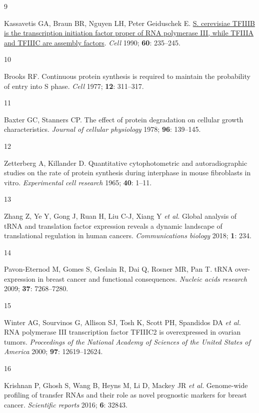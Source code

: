 \documentclass[
  11pt,
]{article}
\newlength{\cslhangindent}
\newlength{\csllabelwidth}
\newlength{\cslentryspacingunit} %
\newenvironment{CSLReferences}[2] %
 {%
  \setlength{\parindent}{0pt}
  \ifodd #1
  \let\oldpar\par
  \def\par{\hangindent=\cslhangindent\oldpar}
  \fi
  \setlength{\parskip}{#2\cslentryspacingunit}
 }%
 {}
\newcommand{\CSLLeftMargin}[1]{\parbox[t]{\csllabelwidth}{#1}}
\newcommand{\CSLRightInline}[1]{\parbox[t]{\linewidth - \csllabelwidth}{#1}\break}
\begin{document}
\begin{CSLReferences}{0}{0}
\leavevmode{}%
\CSLLeftMargin{9 }%
\CSLRightInline{Kassavetis GA, Braun BR, Nguyen LH, Peter Geiduschek E. \href{https://doi.org/10.1016/0092-8674(90)90739-2}{S. cerevisiae TFIIIB is the transcription initiation factor proper of RNA polymerase III, while TFIIIA and TFIIIC are assembly factors}. \emph{Cell} 1990; \textbf{60}: 235--245.}

\leavevmode{}%
\CSLLeftMargin{10 }%
\CSLRightInline{Brooks RF. Continuous protein synthesis is required to maintain the probability of entry into {S} phase. \emph{Cell} 1977; \textbf{12}: 311--317.}

\leavevmode{}%
\CSLLeftMargin{11 }%
\CSLRightInline{Baxter GC, Stanners CP. The effect of protein degradation on cellular growth characteristics. \emph{Journal of cellular physiology} 1978; \textbf{96}: 139--145.}

\leavevmode{}%
\CSLLeftMargin{12 }%
\CSLRightInline{Zetterberg A, Killander D. Quantitative cytophotometric and autoradiographic studies on the rate of protein synthesis during interphase in mouse fibroblasts in vitro. \emph{Experimental cell research} 1965; \textbf{40}: 1--11.}

\leavevmode{}%
\CSLLeftMargin{13 }%
\CSLRightInline{Zhang Z, Ye Y, Gong J, Ruan H, Liu C-J, Xiang Y \emph{et al.} Global analysis of {tRNA} and translation factor expression reveals a dynamic landscape of translational regulation in human cancers. \emph{Communications biology} 2018; \textbf{1}: 234.}

\leavevmode{}%
\CSLLeftMargin{14 }%
\CSLRightInline{Pavon-Eternod M, Gomes S, Geslain R, Dai Q, Rosner MR, Pan T. {tRNA} over-expression in breast cancer and functional consequences. \emph{Nucleic acids research} 2009; \textbf{37}: 7268--7280.}

\leavevmode{}%
\CSLLeftMargin{15 }%
\CSLRightInline{Winter AG, Sourvinos G, Allison SJ, Tosh K, Scott PH, Spandidos DA \emph{et al.} {RNA} polymerase {III} transcription factor {TFIIIC2} is overexpressed in ovarian tumors. \emph{Proceedings of the National Academy of Sciences of the United States of America} 2000; \textbf{97}: 12619--12624.}

\leavevmode{}%
\CSLLeftMargin{16 }%
\CSLRightInline{Krishnan P, Ghosh S, Wang B, Heyns M, Li D, Mackey JR \emph{et al.} Genome-wide profiling of transfer {RNAs} and their role as novel prognostic markers for breast cancer. \emph{Scientific reports} 2016; \textbf{6}: 32843.}


\end{CSLReferences}
\end{document}
